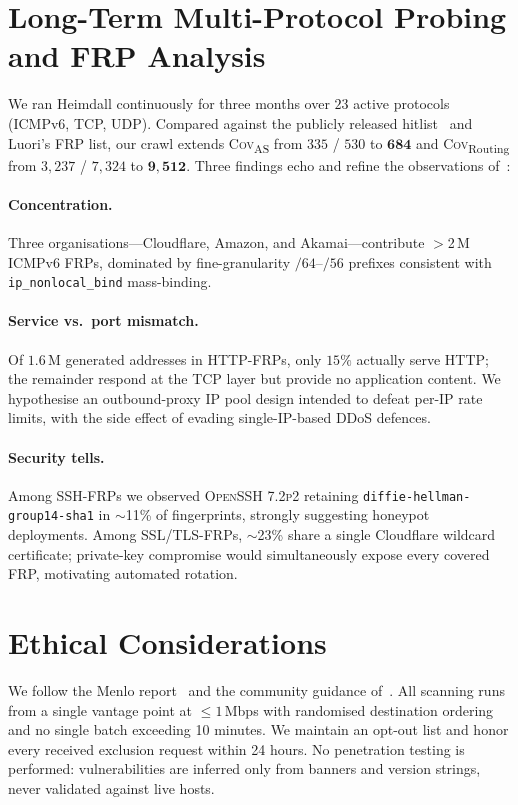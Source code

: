 \documentclass[conference]{IEEEtran}
\begin{document}
\section{Long-Term Multi-Protocol Probing and FRP Analysis}
\label{sec:long}

We ran Heimdall continuously for three months over $23$ active
protocols (ICMPv6, TCP, UDP).  Compared against the publicly released
hitlist~\cite{ipv6hitlist} and Luori's FRP list, our crawl extends
\textsc{Cov}\textsubscript{AS} from $335$ / $530$ to $\mathbf{684}$
and \textsc{Cov}\textsubscript{Routing} from $3{,}237$ / $7{,}324$ to
$\mathbf{9{,}512}$.  Three findings echo and refine the observations
of~\cite{gungnir2025}:

\paragraph{Concentration.}  Three organisations---Cloudflare, Amazon,
and Akamai---contribute $>$2\,M ICMPv6 FRPs, dominated by
fine-granularity $/64$--$/56$ prefixes consistent with
\texttt{ip\_nonlocal\_bind} mass-binding.

\paragraph{Service vs.\ port mismatch.}  Of $1.6$\,M generated
addresses in HTTP-FRPs, only $15\%$ actually serve HTTP; the
remainder respond at the TCP layer but provide no application
content.  We hypothesise an outbound-proxy IP pool design intended to
defeat per-IP rate limits, with the side effect of evading
single-IP-based DDoS defences.

\paragraph{Security tells.}  Among SSH-FRPs we observed
\textsc{OpenSSH 7.2p2} retaining \texttt{diffie-hellman-group14-sha1}
in $\sim$11\% of fingerprints, strongly suggesting honeypot
deployments.  Among SSL/TLS-FRPs, $\sim$23\% share a single Cloudflare
wildcard certificate; private-key compromise would simultaneously
expose every covered FRP, motivating automated rotation.

\section{Ethical Considerations}\label{sec:ethics}
We follow the Menlo report~\cite{menlo} and the community guidance
of~\cite{partridge2016ethical}.  All scanning runs from a single
vantage point at $\leq 1$\,Mbps with randomised destination ordering
and no single batch exceeding 10 minutes.  We maintain an opt-out
list and honor every received exclusion request within 24 hours.  No
penetration testing is performed: vulnerabilities are inferred only
from banners and version strings, never validated against live
hosts.
\end{document}
